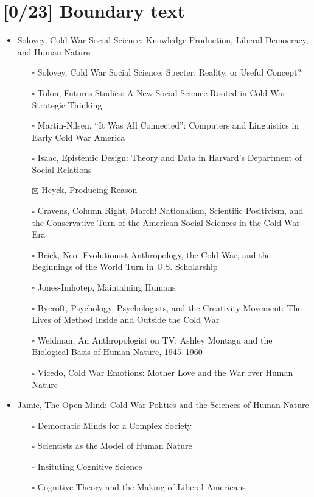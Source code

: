 \documentclass[paper=B6,portrait,twoside=true,twocolumn=false,headinclude=true,footinclude=false,fontsize=12,BCOR=10mm,DIV=calc,pagesize=auto,titlepage=firstiscover,mpinclude=false,headings=normal,headings=twolinechapter,open=right,toc=graduated,chapterprefix=false,numbers=endperiod,parskip=half+]{scrbook}
\theoremstyle{definition}
\begin{document}
\section{[0/23] Boundary text}
\label{sec:org97a510e}
\begin{itemize}
\item\relax [1/11] Solovey, Cold War Social Science: Knowledge Production, Liberal
Democracy, and Human Nature
\begin{itemize}
\item[{$\square$}] Solovey, Cold War Social Science: Specter, Reality, or Useful Concept?
\item[{$\square$}] Tolon, Futures Studies: A New Social Science Rooted in Cold War Strategic Thinking
\item[{$\square$}] Martin-Nilsen, “It Was All Connected”: Computers and Linguistics in Early Cold War America
\item[{$\square$}] Isaac, Epistemic Design: Theory and Data in Harvard’s Department of Social Relations
\item[{$\boxtimes$}] Heyck, Producing Reason
\item[{$\square$}] Cravens, Column Right, March! Nationalism, Scientific Positivism, and the Conservative Turn of the American Social Sciences in the Cold War Era
\item[{$\square$}] Brick, Neo- Evolutionist Anthropology, the Cold War, and the Beginnings of the World Turn in U.S. Scholarship
\item[{$\square$}] Jones-Imhotep, Maintaining Humans
\item[{$\square$}] Bycroft, Psychology, Psychologists, and the Creativity Movement: The Lives of Method Inside and Outside the Cold War
\item[{$\square$}] Weidman, An Anthropologist on TV: Ashley Montagu and the Biological
Basis of Human Nature, 1945–1960
\item[{$\square$}] Vicedo, Cold War Emotions: Mother Love and the War over Human Nature
\end{itemize}
\item\relax [0/5] Jamie, The Open Mind: Cold War Politics and the Sciences of Human
Nature
\begin{itemize}
\item[{$\square$}] Democratic Minds for a Complex Society
\item[{$\square$}] Scientists as the Model of Human Nature
\item[{$\square$}] Insituting Cognitive Science
\item[{$\square$}] Cognitive Theory and the Making of Liberal Americans

\end{itemize}
\end{itemize}
\end{document}
